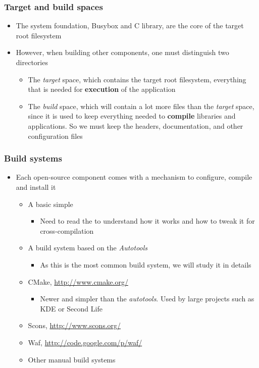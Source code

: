 \begin{frame}
  \frametitle{Target and build spaces}
  \begin{itemize}
  \item The system foundation, Busybox and C library, are the core of
    the target root filesystem
  \item However, when building other components, one must distinguish
    two directories
    \begin{itemize}
    \item The {\em target} space, which contains the target root
      filesystem, everything that is needed for {\bf execution} of the
      application
    \item The {\em build} space, which will contain a lot more files
      than the {\em target} space, since it is used to keep everything
      needed to {\bf compile} libraries and applications. So we must
      keep the headers, documentation, and other configuration files
    \end{itemize}
  \end{itemize}
\end{frame}

\begin{frame}
  \frametitle{Build systems}
  \begin{itemize}
  \item Each open-source component comes with a mechanism to
    configure, compile and install it
    \begin{itemize}
    \item A basic simple 
      \begin{itemize}
      \item Need to read the  to understand how it
        works and how to tweak it for cross-compilation
      \end{itemize}
    \item A build system based on the {\em Autotools}
      \begin{itemize}
      \item As this is the most common build system, we will study it
        in details
      \end{itemize}
    \item CMake, \url{http://www.cmake.org/}
      \begin{itemize}
      \item Newer and simpler than the {\em autotools}. Used by large
        projects such as KDE or Second Life
      \end{itemize}
    \item Scons, \url{http://www.scons.org/}
    \item Waf, \url{http://code.google.com/p/waf/}
    \item Other manual build systems
    \end{itemize}
  \end{itemize}
\end{frame}

